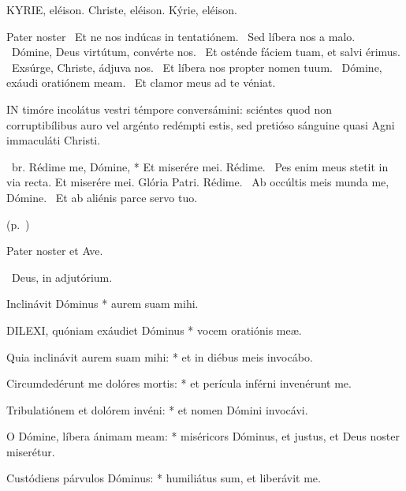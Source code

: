 KYRIE, eléison. Christe, eléison. Kýrie, eléison.

Pater noster  \V\ Et ne nos indúcas in tentatiónem. \R\ Sed líbera nos a malo. \V\ Dómine, Deus virtútum, convérte nos. \R\ Et osténde fáciem tuam, et salvi érimus. \V\ Exsúrge, Christe, ádjuva nos. \R\ Et líbera nos propter nomen tuum. \V\ Dómine, exáudi oratiónem meam. \R\ Et clamor meus ad te véniat.



\lettrine[lines=2]{I}{N} timóre incolátus vestri témpore conversámini: sciéntes quod non corruptibílibus auro vel argénto redémpti estis, sed pretióso sánguine quasi Agni immaculáti Christi.

\R\ br. Rédime me, Dómine, * Et miserére mei. Rédime. \V\ Pes enim meus stetit in via recta. Et miserére mei. Glória Patri. Rédime. \V\ Ab occúltis meis munda me, Dómine. \R\ Et ab aliénis parce servo tuo.

 (p.~\pageref{feria2:precesferialesnona})


\sectionornament


Pater noster et Ave.

\V\ Deus, in adjutórium.

 Inclinávit Dóminus * aurem suam mihi.



\lettrine[lines=2]{D}{ILEXI}, quóniam exáudiet Dóminus * vocem oratiónis meæ.

Quia inclinávit aurem suam mihi: * et in diébus meis invocábo.

Circumdedérunt me dolóres mortis: * et perícula inférni invenérunt me.

Tribulatiónem et dolórem invéni: * et nomen Dómini invocávi.

O Dómine, líbera ánimam meam: * miséricors Dóminus, et justus, et Deus noster miserétur.

Custódiens párvulos Dóminus: * humiliátus sum, et liberávit me.

